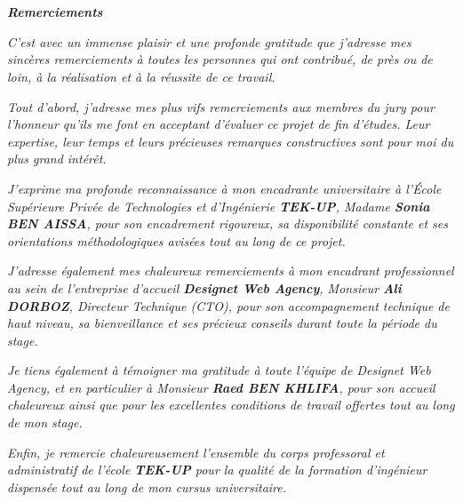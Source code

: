 \chapter*{}

\begin{center}
\Huge \textit{\textbf{Remerciements}}
\vspace{8mm}
\vspace{8mm}

\begingroup
    \large \textit{C'est avec un immense plaisir et une profonde gratitude que j'adresse mes sinc\`eres remerciements \`a toutes les personnes qui ont contribu\'e, de pr\`es ou de loin, \`a la r\'ealisation et \`a la r\'eussite de ce travail.}
    \vspace{8mm}
    
    \textit{Tout d'abord, j'adresse mes plus vifs remerciements aux membres du jury pour l'honneur qu'ils me font en acceptant d'\'evaluer ce projet de fin d'\'etudes. Leur expertise, leur temps et leurs pr\'ecieuses remarques constructives sont pour moi du plus grand int\'er\^et.}

    \vspace{4mm}
    \textit{J'exprime ma profonde reconnaissance \`a mon encadrante universitaire \`a l'\'Ecole Sup\'erieure Priv\'ee de Technologies et d'Ing\'enierie \textbf{TEK-UP}, Madame \textbf{Sonia BEN AISSA}, pour son encadrement rigoureux, sa disponibilit\'e constante et ses orientations m\'ethodologiques avis\'ees tout au long de ce projet.}
    
    \vspace{4mm}
    \textit{J'adresse \'egalement mes chaleureux remerciements \`a mon encadrant professionnel au sein de l'entreprise d'accueil \textbf{Designet Web Agency}, Monsieur \textbf{Ali DORBOZ}, Directeur Technique (CTO), pour son accompagnement technique de haut niveau, sa bienveillance et ses pr\'ecieux conseils durant toute la p\'eriode du stage.}

    \vspace{4mm}
    \textit{Je tiens \'egalement \`a t\'emoigner ma gratitude \`a toute l'\'equipe de Designet Web Agency, et en particulier \`a Monsieur \textbf{Raed BEN KHLIFA}, pour son accueil chaleureux ainsi que pour les excellentes conditions de travail offertes tout au long de mon stage.}

    \vspace{4mm}
    \textit{Enfin, je remercie chaleureusement l'ensemble du corps professoral et administratif de l'\'ecole \textbf{TEK-UP} pour la qualit\'e de la formation d'ing\'enieur dispens\'ee tout au long de mon cursus universitaire.}
\endgroup
\end{center}
